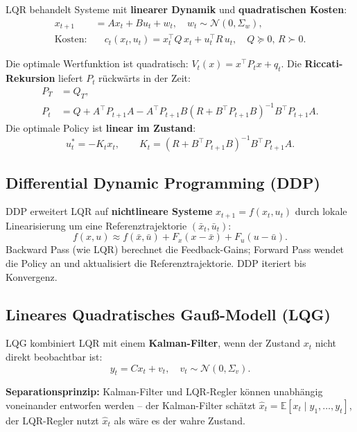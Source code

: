 \documentclass[11pt]{article}
\theoremstyle{csthm}
\theoremstyle{csdef}
\newcommand{\E}{\mathbb{E}}
\newcommand{\N}{\mathcal{N}}
\newcommand{\T}{^\top}
\begin{document}
LQR behandelt Systeme mit \textbf{linearer Dynamik} und
\textbf{quadratischen Kosten}:
\begin{align}
  x_{t+1} &= Ax_t + Bu_t + w_t, \quad w_t \sim \N(0, \Sigma_w), \\
  \text{Kosten:} &\quad c_t(x_t, u_t) = x_t\T Q\, x_t + u_t\T R\, u_t,
  \quad Q \succeq 0,\, R \succ 0.
\end{align}

Die optimale Wertfunktion ist quadratisch: $V_t(x) = x\T P_t x + q_t$.
Die \textbf{Riccati-Rekursion} liefert $P_t$ rückwärts in der Zeit:
\begin{align}
  P_T &= Q_T, \\
  P_t &= Q + A\T P_{t+1} A
    - A\T P_{t+1} B(R + B\T P_{t+1} B)^{-1} B\T P_{t+1} A.
\end{align}
Die optimale Policy ist \textbf{linear im Zustand}:
\begin{equation}
  u_t^* = -K_t x_t, \qquad
  K_t = (R + B\T P_{t+1} B)^{-1} B\T P_{t+1} A.
\end{equation}

\subsection{Differential Dynamic Programming (DDP)}

DDP erweitert LQR auf \textbf{nichtlineare Systeme}
$x_{t+1} = f(x_t, u_t)$ durch lokale Linearisierung um eine
Referenztrajektorie $(\bar x_t, \bar u_t)$:
\begin{equation}
  f(x,u) \approx f(\bar x,\bar u) + F_x(x - \bar x) + F_u(u - \bar u).
\end{equation}
Backward Pass (wie LQR) berechnet die Feedback-Gains; Forward Pass wendet
die Policy an und aktualisiert die Referenztrajektorie. DDP iteriert bis
Konvergenz.

\subsection{Lineares Quadratisches Gauß-Modell (LQG)}

LQG kombiniert LQR mit einem \textbf{Kalman-Filter}, wenn der Zustand $x_t$
nicht direkt beobachtbar ist:
\begin{equation}
  y_t = Cx_t + v_t, \quad v_t \sim \N(0, \Sigma_v).
\end{equation}

\textbf{Separationsprinzip:} Kalman-Filter und LQR-Regler können unabhängig
voneinander entworfen werden -- der Kalman-Filter schätzt $\hat x_t = \E[x_t
\mid y_1,\ldots,y_t]$, der LQR-Regler nutzt $\hat x_t$ als wäre es der wahre
Zustand.
\end{document}
